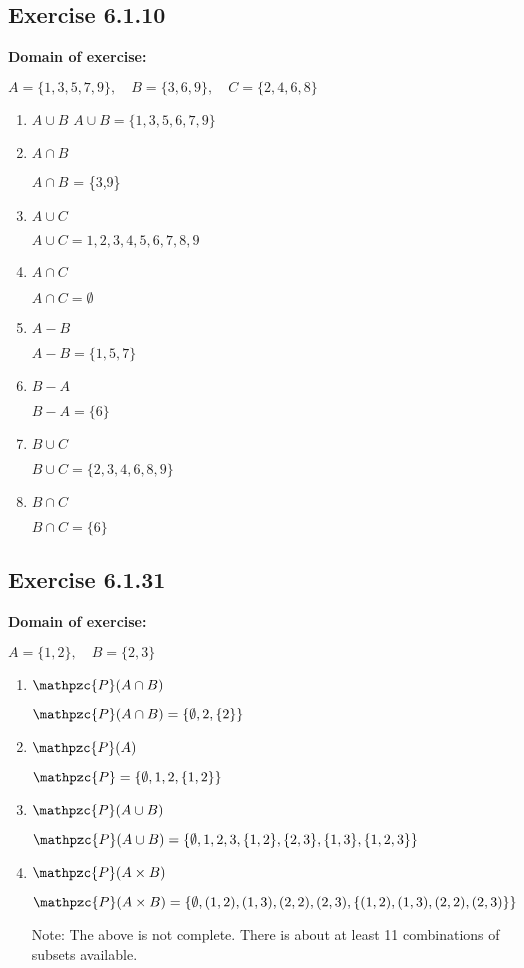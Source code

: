 \documentclass{article}
\newcommand{\cent}[1]{\begin{center}#1\end{center}}
\newcommand{\script}[1]{\mathpzc{#1}}
\newcommand{\Domain}{\textbf{Domain of exercise: }}
\newcommand{\Exercise}[1]{\subsection*{Exercise #1}}
\begin{document}
		\Exercise{6.1.10}
		
		\Domain
		\cent{$A = \{1,3,5,7,9\}, \quad B = \{3,6,9\}, \quad C = \{2,4,6,8\}$}
				
		
		\begin{enumerate}[label = \textbf{\alph*.}]
			\item $A \cup B$
			$A \cup B = \{1,3,5,6,7,9\}$
			
			\item $A \cap B$
			
			$A \cap B$ = \{3,9\}
			
			\item $A \cup C$
			
			\cent{$A \cup C = 1,2,3,4,5,6,7,8,9$}
			
			\item $A \cap C$
			
			\cent{$A \cap C = \emptyset$}
			
			\item $A-B$
			
			\cent{$A-B = \{1,5,7\}$}
			
			\item $B-A$
			
			\cent{$B - A = \{6\}$}
			
			\item $B \cup C$
			
			\cent{$B \cup C = \{2,3,4,6,8,9\}$}
			
			\item $B \cap C$
			
			\cent{$B \cap C = \{6\}$}
		\end{enumerate}
		
		\Exercise{6.1.31}
		
		\Domain
		
		\cent{$A = \{1,2\}, \quad B = \{2,3\}$}
		
		\begin{enumerate}[label = \textbf{\alph*.}]
			\item $\script{P}(A \cap B)$
			
			\cent{$\script{P}(A \cap B) = \{\emptyset,2,\{2\}\}$}
			
			\item $\script{P}(A)$
			
			\cent{$\script{P} = \{\emptyset,1,2,\{1,2\}\}$}
			
			\item $\script{P}(A \cup B)$
			
			\cent{$\script{P}(A \cup B) = \{\emptyset,1,2,3,\{1,2\},\{2,3\},\{1,3\},\{1,2,3\}\}$}
			
			\item $\script{P}(A \times B)$
			
			\cent{$\script{P}(A \times B) = \{\emptyset,(1,2),(1,3),(2,2),(2,3),\{(1,2),(1,3),(2,2),(2,3)\}\}$}
			
			Note: The above is not complete. There is about at least 11 combinations of subsets available.
		\end{enumerate}
	
\end{document}
